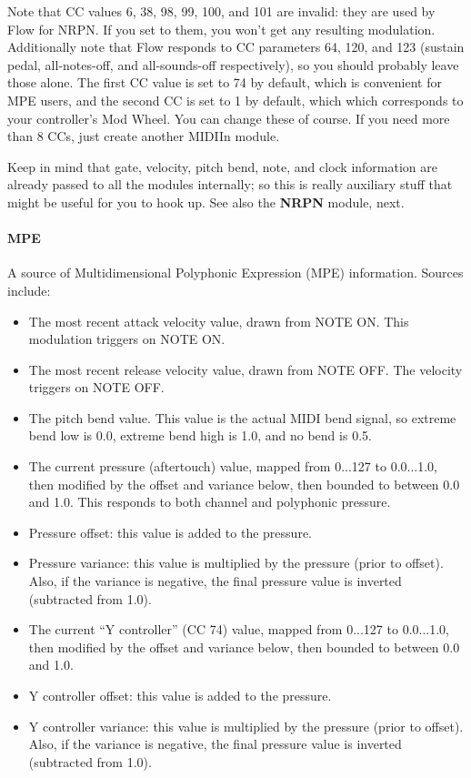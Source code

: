 \documentclass{article}
\newcommand\name{Flow}
\begin{document}
\begin{itemize}
Note that CC values 6, 38, 98, 99, 100, and 101 are invalid: they are used by {\name} for NRPN.  If you set to them, you won't get any resulting modulation.  Additionally note that Flow responds to CC parameters 64, 120, and 123 (sustain pedal, all-notes-off, and all-sounds-off respectively), so you should probably leave those alone.   The first CC value is set to 74 by default, which is convenient for MPE users, and the second CC is set to 1 by default, which which corresponds to your controller's Mod Wheel.  You can change these of course.  If you need more than 8 CCs, just create another MIDIIn module.
\end{itemize}

Keep in mind that gate, velocity, pitch bend, note, and clock information are already passed to all the modules internally; so this is really auxiliary stuff that might be useful for you to hook up.   See also the {\bf NRPN} module, next.

\paragraph{MPE}  A source of Multidimensional Polyphonic Expression (MPE) information.  Sources include:

\begin{itemize}
\item The most recent attack velocity value, drawn from NOTE ON. This modulation triggers on NOTE ON.
\item The most recent release velocity value, drawn from NOTE OFF.  The velocity triggers on NOTE OFF.
\item The pitch bend value.  This value is the actual MIDI bend signal, so extreme bend low is 0.0, extreme bend high is 1.0, and no bend is 0.5.
\item The current pressure (aftertouch) value, mapped from 0...127 to 0.0...1.0, then modified by the offset and variance below, then bounded to between 0.0 and 1.0.  This responds to both channel and polyphonic pressure.
\item Pressure offset: this value is added to the pressure.
\item Pressure variance: this value is multiplied by the pressure (prior to offset).  Also, if the variance is negative, the final pressure value is inverted (subtracted from 1.0).
\item The current ``Y controller'' (CC 74) value, mapped from 0...127 to 0.0...1.0, then modified by the offset and variance below, then bounded to between 0.0 and 1.0.
\item Y controller offset: this value is added to the pressure.
\item Y controller variance: this value is multiplied by the pressure (prior to offset).  Also, if the variance is negative, the final pressure value is inverted (subtracted from 1.0).
\end{itemize}
\end{document}

